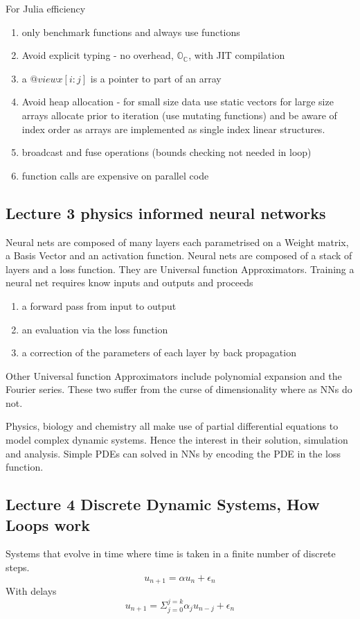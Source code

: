For Julia efficiency
\begin{enumerate}
\item only benchmark functions and always use functions
\item Avoid explicit typing - no  overhead, $\mathbb{O_C}$, with JIT compilation
\item a $@view x[i:j]$ is a pointer to part of an array
\item Avoid heap allocation - for small size data use static vectors  for large size arrays allocate  prior to iteration (use mutating functions) and be aware of index order as arrays are implemented as single index linear structures.

\item broadcast and fuse operations   (bounds checking not needed in loop)
\item function calls are expensive on parallel code
\end{enumerate}

\subsection{Lecture 3 physics informed neural networks}
 Neural nets are composed of many layers each parametrised on a Weight matrix, a Basis Vector and an activation function. Neural nets are composed of a stack of layers and a loss function. They are Universal function Approximators.
 Training  a neural net requires know inputs and outputs and proceeds
 \begin{enumerate}
 \item a forward pass from input to output
 \item an evaluation via the loss function 
 \item a correction of the parameters of each layer by back propagation
\end{enumerate}  

Other Universal function Approximators include polynomial expansion and the Fourier series.  These two suffer from the curse of dimensionality where as NNs do not. 

Physics, biology and chemistry  all make use of partial differential equations to model complex dynamic systems. Hence the interest in their solution, simulation and  analysis.
Simple PDEs can solved in NNs by encoding  the PDE in the loss function.

\subsection{Lecture 4 Discrete Dynamic Systems, How Loops work}
Systems that evolve in time where time is taken in a finite number of discrete steps.
\[u_{n+1} = \alpha u_n + \epsilon_n\]
With delays 
\[u_{n+1} = \Sigma^{j=k}_{j=0}\alpha_j u_{n-j} + \epsilon_n\]

